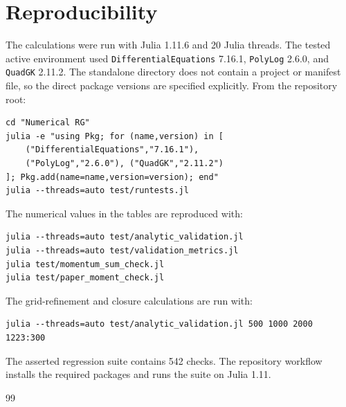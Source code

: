\documentclass[11pt]{article}
\begin{document}
\section{Reproducibility}

The calculations were run with Julia 1.11.6 and 20 Julia threads. The tested
active environment used \texttt{DifferentialEquations} 7.16.1,
\texttt{PolyLog} 2.6.0, and \texttt{QuadGK} 2.11.2. The standalone directory
does not contain a project or manifest file, so the direct package versions
are specified explicitly. From the repository root:
\begin{verbatim}
cd "Numerical RG"
julia -e "using Pkg; for (name,version) in [
    ("DifferentialEquations","7.16.1"),
    ("PolyLog","2.6.0"), ("QuadGK","2.11.2")
]; Pkg.add(name=name,version=version); end"
julia --threads=auto test/runtests.jl
\end{verbatim}

The numerical values in the tables are reproduced with:
\begin{verbatim}
julia --threads=auto test/analytic_validation.jl
julia --threads=auto test/validation_metrics.jl
julia test/momentum_sum_check.jl
julia test/paper_moment_check.jl
\end{verbatim}

The grid-refinement and closure calculations are run with:
\begin{verbatim}
julia --threads=auto test/analytic_validation.jl 500 1000 2000 1223:300
\end{verbatim}

The asserted regression suite contains 542 checks. The repository workflow
 installs the required packages and
runs the suite on Julia 1.11.

\begin{thebibliography}{99}

\end{thebibliography}
\end{document}
